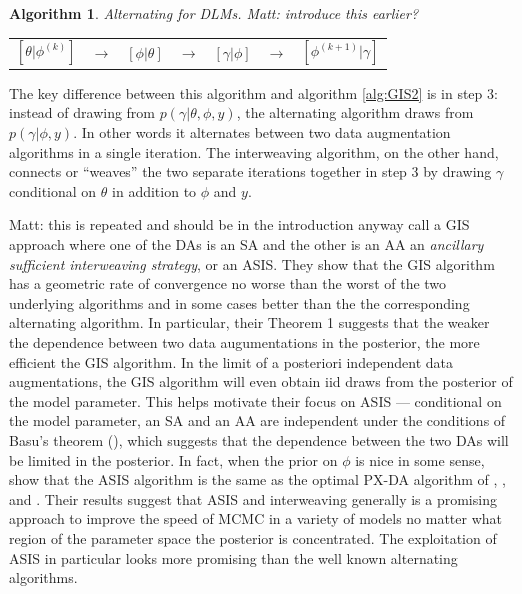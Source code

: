 \documentclass{article}
\newtheorem{alg}{Algorithm}
\newcommand{\matt}[1]{{\color{red} Matt: #1}}
\begin{document}
\begin{alg}Alternating for DLMs.\label{alg:ALT} \matt{introduce this earlier?} \\
  \begin{center}
    \begin{tabular}{lllllll}
  $[\theta|\phi^{(k)}]$& $\to$& $[\phi|\theta]$& $\to$& $[\gamma|\phi]$& $\to$& $[\phi^{(k+1)}|\gamma]$
    \end{tabular}
  \end{center}
\end{alg}
The key difference between this algorithm and algorithm \ref{alg:GIS2} is in step 3: instead of drawing from $p(\gamma|\theta,\phi,y)$, the alternating algorithm draws from $p(\gamma|\phi,y)$. In other words it alternates between two data augmentation algorithms in a single iteration. The interweaving algorithm, on the other hand, connects or ``weaves'' the two separate iterations together in step 3 by drawing $\gamma$ conditional on $\theta$ in addition to $\phi$ and $y$.

\matt{this is repeated and should be in the introduction anyway}
\citet{yu2011center} call a GIS approach where one of the DAs is an SA and the other is an AA an {\it ancillary sufficient interweaving strategy}, or an ASIS. They show that the GIS algorithm has a geometric rate of convergence no worse than the worst of the two underlying algorithms and in some cases better than the the corresponding alternating algorithm. In particular, their Theorem 1 suggests that the weaker the dependence between two data augumentations in the posterior, the more efficient the GIS algorithm. In the limit of a posteriori independent data augmentations, the GIS algorithm will even obtain iid draws from the posterior of the model parameter. This helps motivate their focus on ASIS --- conditional on the model parameter, an SA and an AA are independent under the conditions of Basu's theorem (\citet{basu1955statistics}), which suggests that the dependence between the two DAs will be limited in the posterior. In fact, when the prior on $\phi$ is nice in some sense, \citet{yu2011center} show that the ASIS algorithm is the same as the optimal PX-DA algorithm of \citet{meng1999seeking}, \citet{liu1999parameter}, \citet{van2001art} and \citet{hobert2008theoretical}. Their results suggest that ASIS and interweaving generally is a promising approach to improve the speed of MCMC in a variety of models no matter what region of the parameter space the posterior is concentrated. The exploitation of ASIS in particular looks more promising than the well known alternating algorithms. 
\end{document}

